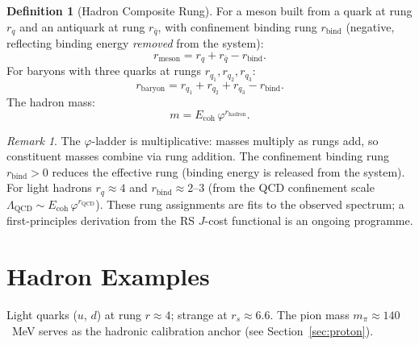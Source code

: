 \documentclass[12pt,a4paper]{article}
\theoremstyle{definition}
\newtheorem{definition}[theorem]{Definition}
\theoremstyle{remark}
\newtheorem{remark}[theorem]{Remark}
\begin{document}
\begin{definition}[Hadron Composite Rung]
\label{def:composite}
For a meson built from a quark at rung $r_{q}$ and an antiquark
at rung $r_{\bar{q}}$, with confinement binding rung
$r_{\mathrm{bind}}$ (negative, reflecting binding energy
\emph{removed} from the system):
\begin{equation}
  r_{\mathrm{meson}} = r_{q} + r_{\bar{q}} - r_{\mathrm{bind}}.
\end{equation}
For baryons with three quarks at rungs $r_{q_1}, r_{q_2}, r_{q_3}$:
\begin{equation}
  r_{\mathrm{baryon}} = r_{q_1} + r_{q_2} + r_{q_3}
  - r_{\mathrm{bind}}.
\end{equation}
The hadron mass:
\begin{equation}
  m = E_{\mathrm{coh}}\,\varphi^{r_{\mathrm{hadron}}}.
\end{equation}
\end{definition}

\begin{remark}
The $\varphi$-ladder is multiplicative: masses multiply as rungs
add, so constituent masses combine via rung addition.  The
confinement binding rung $r_{\mathrm{bind}} > 0$ reduces the
effective rung (binding energy is released from the system).
For light hadrons $r_q \approx 4$ and $r_{\mathrm{bind}} \approx
2$--$3$ (from the QCD confinement scale
$\Lambda_{\mathrm{QCD}} \sim E_{\mathrm{coh}}\,\varphi^{r_{\mathrm{QCD}}}$).
These rung assignments are fits to the observed spectrum;
a first-principles derivation from the RS $J$-cost functional
is an ongoing programme.
\end{remark}

\section{Hadron Examples}\label{sec:examples}

Light quarks ($u$, $d$) at rung $r \approx 4$; strange at $r_s \approx 6.6$.
The pion mass $m_\pi \approx 140$~MeV serves as the hadronic calibration
anchor (see Section~\ref{sec:proton}).
\end{document}
